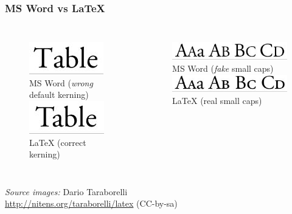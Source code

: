 \documentclass{beamer}
\begin{document}

\begin{frame}
\frametitle{MS Word vs \LaTeX}


\begin{columns}

\column[t]{4cm}



\begin{figure}[h]

\begin{center}

\bigskip
  \centering
	\includegraphics[scale=0.70,clip=true]{figs/kerning_word.jpg} \\
 	\small MS Word (\textit{wrong} default kerning) \\
	\bigskip
	\includegraphics[scale=0.70,clip=true]{figs/kerning_latex.jpg} \\
	\small \LaTeX{} (\alert{correct} kerning) \\
\end{center}
\end{figure}


\column[t]{5cm}

	\pause

\begin{figure}[h]

\begin{center}
\bigskip
  \centering
	\includegraphics[scale=0.5,clip=true]{figs/sc_word.jpg} \\
	\small MS Word (\textit{fake} small caps) \\
	\bigskip
	\includegraphics[scale=0.5,clip=true]{figs/sc_latex.jpg} \\
	\small \LaTeX{} (\alert{real} small caps)
\end{center}
\end{figure}

\end{columns}

\bigskip

\pause

\begin{center}
\tiny \textit{Source images:} Dario Taraborelli \\ 
\url{http://nitens.org/taraborelli/latex} (CC-by-sa)
\end{center}

\end{frame}
\end{document}
